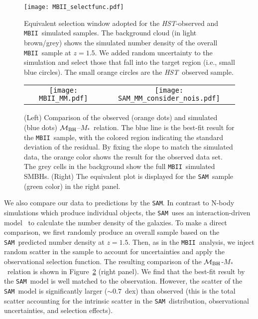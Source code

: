\documentclass[twocolumn,trackchanges]{aastex63}
\newcommand{\hst}{{\it HST}}
\newcommand{\mbh}{$\mathcal M_{\rm BH}$}
\newcommand{\mstar}{{$M_*$}}
\newcommand{\sam}{\texttt{SAM}}
\newcommand{\mbii}{\texttt{MBII}}
\newcommand{\pink}[1]{{{#1}}}
\begin{document}
\begin{figure}[t]
\texttt{[image: MBII\_selectfunc.pdf]}
\caption{Equivalent selection window adopted for the \hst-observed and  \mbii\ simulated samples. The background cloud (in light brown/grey) shows the simulated number density of the overall \mbii\ sample at $z=1.5$. We added random uncertainty to the simulation and select those that fall into the target region (i.e., small blue circles). The small orange circles are the \hst\ observed sample.}
\label{fig:selectfunc}
\end{figure}

\begin{figure*}[t]%
\begin{tabular}{c c}
\texttt{[image: MBII\_MM.pdf]} &
\texttt{[image: SAM\_MM\_consider\_nois.pdf]} \\
\end{tabular}
\caption{(Left) Comparison of the observed (orange dots) and simulated (blue dots) \mbh--\mstar\ relation. The blue line is the best-fit result for the \mbii\ sample, with the colored region indicating the standard deviation of the residual. By fixing the slope to match the simulated data, the orange color shows the result for the observed data set. The grey cells in the background show the full \mbii\ simulated SMBHs. (Right) The equivalent plot is displayed for the \sam\ sample (green color) in the right panel.}
\label{fig:MM_comp}
\end{figure*}

We also compare our data to predictions by the \sam. In contrast to N-body simulations which produce individual objects, the \sam\ \pink{uses an interaction-driven model~\citep{Menci2014} to calculate the number density of the galaxies.} To make a direct comparison, we first randomly produce an overall sample based on the \pink{\sam\ predicted number density} at $z=1.5$. Then, as in the \mbii\ analysis, we inject random scatter in the sample to account for uncertainties and apply the observational selection function. The resulting comparison of the  \mbh-\mstar\ relation is shown in Figure~\ref{fig:MM_comp} (right panel). We find that the best-fit result by the \sam\ model is well matched to the observation. However, the scatter of the \sam\ model is significantly larger ($\sim0.7$~dex) than observed (this is the total scatter accounting for the intrinsic scatter in the \sam\ distribution, observational uncertainties, and selection effects).  
\end{document}
